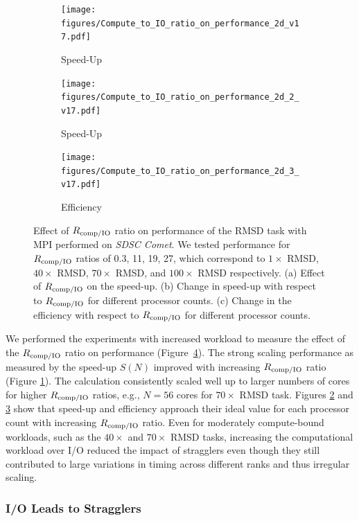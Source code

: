 \begin{figure}[!htb]
  \centering
  \begin{subfigure} {.3\textwidth}
    \texttt{[image: figures/Compute\_to\_IO\_ratio\_on\_performance\_2d\_v17.pdf]}
    \caption{Speed-Up}
    \label{fig:S1_tcomp_tIO_effect}
  \end{subfigure}
  \hfill
  \begin{subfigure}{.3\textwidth}
    \texttt{[image: figures/Compute\_to\_IO\_ratio\_on\_performance\_2d\_2\_v17.pdf]}
    \caption{Speed-Up}
    \label{fig:S2_tcomp_tIO_effect}
  \end{subfigure}
  \hfill
  \begin{subfigure}{.3\textwidth}
    \texttt{[image: figures/Compute\_to\_IO\_ratio\_on\_performance\_2d\_3\_v17.pdf]}
    \caption{Efficiency}
    \label{fig:E_tcomp_tIO_effect}
  \end{subfigure}
  \caption{Effect of $R_{\text{comp/IO}}$ ratio on performance of the RMSD task with MPI performed on \emph{SDSC Comet}. We tested performance for $R_{\text{comp/IO}}$ ratios of 0.3, 11, 19, 27, which correspond to $1\times$ RMSD, $40\times$ RMSD, $70\times$ RMSD, and $100\times$ RMSD respectively.
    (a) Effect of $R_{\text{comp/IO}}$ on the speed-up.
    (b) Change in speed-up with respect to $R_{\text{comp/IO}}$ for different processor counts.
    (c) Change in the efficiency with respect to $R_{\text{comp/IO}}$ for different processor counts.}
  \label{fig:tcomp_tIO_effect}
\end{figure}

We performed the experiments with increased workload to measure the effect of the $R_{\text{comp/IO}}$ ratio on performance (Figure~\ref{fig:tcomp_tIO_effect}).
The strong scaling performance as measured by the speed-up $S(N)$ improved with increasing $R_{\text{comp/IO}}$ ratio (Figure \ref{fig:S1_tcomp_tIO_effect}).
The calculation consistently scaled well up to larger numbers of cores for higher $R_{\text{comp/IO}}$ ratios, e.g., $N=56$ cores for $70\times$ RMSD task. 
Figures \ref{fig:S2_tcomp_tIO_effect} and \ref{fig:E_tcomp_tIO_effect} show that speed-up and efficiency approach their ideal value for each processor count with increasing $R_{\text{comp/IO}}$ ratio.
Even for moderately compute-bound workloads, such as the $40\times$ and $70\times$ RMSD tasks, increasing the computational workload over I/O reduced the impact of stragglers even though they still contributed to large variations in timing across different ranks and thus irregular scaling.



\subsubsection{I/O Leads to Stragglers}

